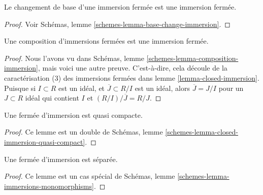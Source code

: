\begin{lemma}

\label{lemma-base-change-closed-immersion}

Le changement de base d'une immersion fermée est une immersion fermée.

\end{lemma}

\begin{proof}
Voir Schémas, lemme \ref{schemes-lemma-base-change-immersion}.
\end{proof}

\begin{lemma}

\label{lemma-composition-closed-immersion}

Une composition d'immersions fermées est une immersion fermée.

\end{lemma}

\begin{proof}
Nous l'avons vu dans Schémas, lemme \ref{schemes-lemma-composition-immersion}, mais voici une autre preuve. C'est-à-dire, cela découle de la caractérisation (3) des immersions fermées dans lemme \ref{lemma-closed-immersion}. Puisque si $I \subset R$ est un idéal, et $\overline{J} \subset R/I$ est un idéal, alors $\overline{J} = J/I$ pour un $J \subset R$ idéal qui contient $I$ et $(R/I)/\overline{J} = R/J$.
\end{proof}

\begin{lemma}

\label{lemma-closed-immersion-quasi-compact}

Une fermée d'immersion est quasi compacte.

\end{lemma}

\begin{proof}
Ce lemme est un double de Schémas, lemme \ref{schemes-lemma-closed-immersion-quasi-compact}.
\end{proof}

\begin{lemma}

\label{lemma-closed-immersion-separated}

Une fermée d'immersion est séparée.

\end{lemma}

\begin{proof}
Ce lemme est un cas spécial de Schémas, lemme \ref{schemes-lemma-immersions-monomorphisms}.
\end{proof}





